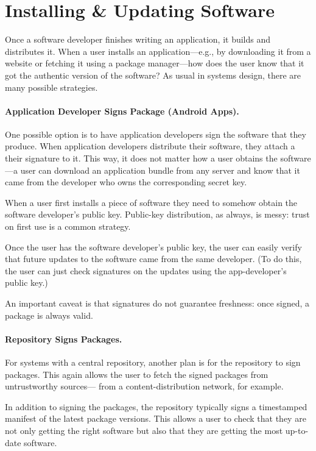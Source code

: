 \section{Installing \& Updating Software}

Once a software developer finishes writing 
an application, it builds and distributes it.
When a user installs an application---e.g., by
downloading it from a website or fetching it 
using a package manager---how does the user
know that it got the authentic version of the software?
As usual in systems design, there are many possible strategies.

\paragraph{Application Developer Signs Package (Android Apps).}
One possible option is to have application
developers sign the software that they produce.
When application developers distribute their software, 
they attach a their signature to it.
This way, it does not matter how
a user obtains the software---a user can
download an application bundle from any server and
know that it came from the developer who owns the
corresponding secret key.

When a user first installs a piece of software they
need to somehow obtain the software developer's public key.
Public-key distribution, as always, is messy: trust on 
first use is a common strategy.

Once the user has the software developer's public key,
the user can easily verify that future updates to the
software came from the same developer. (To do this,
the user can just check signatures on the updates
using the app-developer's public key.)

An important caveat is that signatures do not guarantee
freshness: once signed, a package is always valid.


\paragraph{Repository Signs Packages.}
For systems with a central repository, another
plan is for the repository to sign packages. This
again allows the user to fetch the signed packages
from untrustworthy sources---%
from a content-distribution network, for example.

In addition to signing the packages, the repository
typically signs a timestamped manifest of the latest package versions.
This allows a user to check that they are not only 
getting the right software but also that they are
getting the most up-to-date software.

